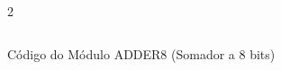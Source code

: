 \begin{figure}[H]
    \centering   
    \begin{tcolorbox}  
        \begin{multicols}{2} 
        \fontsize{9pt}{9pt}\selectfont\inputminted[obeytabs=true,tabsize=4,xleftmargin=20pt,linenos,breaklines]{VHDL}{VHDL/files/ADDER8.vhd}    
        \end{multicols}
    \end{tcolorbox}   
    \caption{Código do Módulo ADDER8 (Somador a 8 bits)}
\end{figure}
